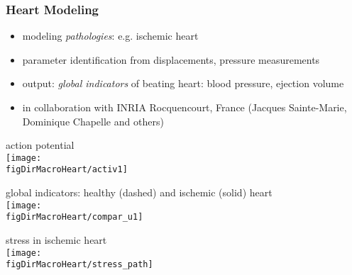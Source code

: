 \begin{frame}
  \frametitle{Heart Modeling}
  \begin{itemize}
  \item modeling \emph{pathologies}: e.g. ischemic heart
  \item parameter identification from displacements, pressure measurements
  \item output: \emph{global indicators} of beating heart: blood pressure,
    ejection volume
  \item in collaboration with INRIA Rocquencourt, France (Jacques Sainte-Marie,
    Dominique Chapelle and others)
  \end{itemize}
  \begin{center}
    \begin{minipage}{0.28\linewidth}
      \scriptsize
      action potential \\
      \texttt{[image: \\figDirMacroHeart/activ1]}
    \end{minipage}
    \hfill
    \begin{minipage}{0.4\linewidth}
      \scriptsize
      global indicators: healthy (dashed) and ischemic (solid) heart \\
      \texttt{[image: \\figDirMacroHeart/compar\_u1]}
    \end{minipage}
    \hfill
    \begin{minipage}{0.28\linewidth}
      \scriptsize
      stress in ischemic heart \\
      \texttt{[image: \\figDirMacroHeart/stress\_path]}
    \end{minipage}
  \end{center}
\end{frame}
